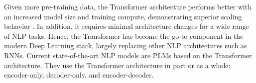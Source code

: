 

Given more pre-training data, the Transformer architecture performs better with an increased model size and training compute, demonstrating superior scaling behavior \citep{kaplan2020scaling}. In addition, it requires minimal architecture changes for a wide range of \ac{NLP} tasks. Hence, the Transformer has become the go-to component in the modern Deep Learning stack, largely replacing other \ac{NLP} architectures such as \acp{RNN}. Current state-of-the-art \ac{NLP} models are \acp{PLM} based on the Transformer architecture. They use the Transformer architecture in part or as a whole: encoder-only, decoder-only, and encoder-decoder.
 



